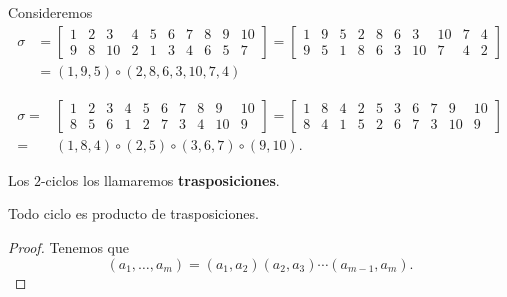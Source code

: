 \begin{eg}
\normalfont Consideremos 
\[
\begin{split}
	\sigma & = \begin{bmatrix} 1 & 2 & 3 & 4 & 5 & 6 & 7 & 8 & 9 & 10  \\  9 & 8 & 10 & 2 & 1 & 3 & 4 & 6 & 5 & 7 \end{bmatrix} = \begin{bmatrix} 1 & 9 & 5 & 2 & 8 & 6 & 3 & 10 & 7 & 4\\
9 & 5 & 1 & 8 & 6 & 3 & 10 & 7 & 4 & 2\end{bmatrix} \\
& = \left(1, 9, 5\right) \circ \left(2, 8, 6, 3, 10, 7, 4\right)
\end{split}
\]
\end{eg}
\begin{eg}
\normalfont 
\[
\begin{split}
	\sigma = & \begin{bmatrix} 1 & 2 & 3 & 4 & 5 & 6 & 7 & 8 & 9 & 10 \\
		8 & 5 & 6 & 1 & 2 & 7 & 3 & 4 & 10 & 9\end{bmatrix} = \begin{bmatrix} 1 & 8 & 4 & 2 & 5 & 3 & 6 & 7 & 9 & 10 \\ 8 & 4 & 1 & 5 & 2 & 6 & 7 & 3 & 10 & 9\end{bmatrix} \\
		= & \left(1,8, 4\right) \circ \left(2, 5\right) \circ \left(3, 6, 7\right) \circ \left(9, 10\right).
\end{split}
\]
\end{eg}

\begin{fdefinition}[]
\normalfont Los $\displaystyle 2 $-ciclos los llamaremos \textbf{trasposiciones}.
\end{fdefinition}

\begin{fprop}[]
\normalfont Todo ciclo es producto de trasposiciones.
\end{fprop}
\begin{proof}
Tenemos que 
\[\left(a_{1}, \ldots, a_{m}\right) = \left(a_{1}, a_{2}\right)\left(a_{2}, a_{3}\right) \cdots \left(a_{m -1}, a_{m}\right) .\]
\end{proof}


